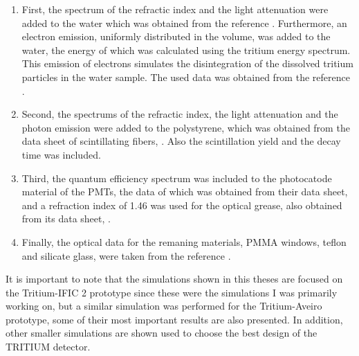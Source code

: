 \begin{enumerate}

\item{} First, the spectrum of the refractic index and the light attenuation were added to the water which was obtained from the reference \cite{WaterPropertiesSimulation}. Furthermore, an electron emission, uniformly distributed in the volume, was added to the water, the energy of which was calculated using the tritium energy spectrum. This emission of electrons simulates the disintegration of the dissolved tritium particles in the water sample. The used data was obtained from the reference \cite{TritiumEmissionSpectrum}.

\item{} Second, the spectrums of the refractic index, the light attenuation and the photon emission were added to the polystyrene, which was obtained from the data sheet of scintillating fibers, \cite{DataSheetBCF12Fiber}.  Also the scintillation yield and the decay time was included. 

\item{} Third, the quantum efficiency spectrum was included to the photocatode material of the PMTs, the data of which was obtained from their data sheet, \cite{DataSheetPMTs} and a refraction index of 1.46 was used for the optical grease, also obtained from its data sheet, \cite{OpticalGrease}.

\item{} Finally, the optical data for the remaning materials, PMMA windows, teflon and silicate glass, were taken from the reference \cite{NEMODataSimulation}.

\end{enumerate} 

It is important to note that the simulations shown in this theses are focused on the Tritium-IFIC 2 prototype since these were the simulations I was primarily working on, but a similar simulation was performed for the Tritium-Aveiro prototype, some of their most important results are also presented. In addition, other smaller simulations are shown used to choose the best design of the TRITIUM detector.